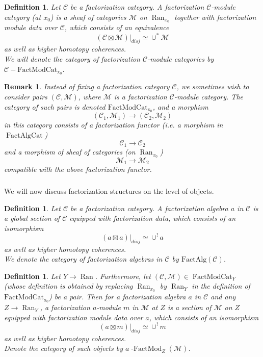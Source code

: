 \documentclass[10pt,a4paper]{amsart}
\newtheorem{defn}[subsubsection]{Definition}
\newtheorem{rem}[subsubsection]{Remark}
\newcommand{\on}[1]{\operatorname{#1}}
\newcommand{\Ran}{\on{Ran}}
\newcommand{\FactAlgCat}{\on{FactAlgCat}}
\newcommand{\FactModCat}{\on{FactModCat_{x_0}}}
\newcommand{\sssec}[1]{\subsubsection{}}
\begin{document}
\begin{defn}
    Let $\mathcal{C}$ be a factorization category. A factorization $\mathcal{C}$-module category (at $x_0$) is a sheaf of categories $\mathcal{M}$ on $\Ran_{x_0}$ together with factorization module data over $\mathcal{C}$, which consists of an equivalence 
    $$
        (\mathcal{C} \boxtimes \mathcal{M})|_{disj} \simeq \cup^* \mathcal{M}
    $$
    as well as higher homotopy coherences.
    \\
    We will denote the category of factorization $\mathcal{C}$-module categories by $\mathcal{C}-\FactModCat$.
\end{defn}

\begin{rem}
    Instead of fixing a factorization category $\mathcal{C}$, we sometimes wish to consider \emph{pairs} $(\mathcal{C}, \mathcal{M})$, where $\mathcal{M}$ is a factorization $\mathcal{C}$-module category. The category of such pairs is denoted $\FactModCat$, and a morphism
    $$
    (\mathcal{C}_1, \mathcal{M}_1) \to (\mathcal{C}_2, \mathcal{M}_2)
    $$
    in this category consists of a factorization functor (i.e. a morphism in $\FactAlgCat$)
    $$
    \mathcal{C}_1 \to \mathcal{C}_2
    $$
    and a morphism of sheaf of categories (on $\Ran_{x_0}$)
    $$
    \mathcal{M}_1 \to \mathcal{M}_2
    $$
    compatible with the above factorization functor.
\end{rem}

\sssec{}
We will now discuss factorization structures on the level of objects.

\begin{defn}
    Let $\mathcal{C}$ be a factorization category. A factorization algebra $a$ in $\mathcal{C}$ is a global section of $\mathcal{C}$ equipped with factorization data, which consists of an isomorphism
    $$
    (a \boxtimes a)|_{disj} \simeq \cup^!a
    $$
    as well as higher homotopy coherences.
    \\
    We denote the category of factorization algebras in $\mathcal{C}$ by $\on{FactAlg(\mathcal{C})}$.
\end{defn}

\begin{defn}
    Let $Y \to \Ran$. Furthermore, let $(\mathcal{C}, \mathcal{M}) \in \on{FactModCat}_{Y}$ (whose definition is obtained by replacing $\Ran_{x_0}$ by $\Ran_{Y}$ in the definition of $\FactModCat$) be a pair. Then for a factorization algebra $a$ in $\mathcal{C}$ and any $Z \to \Ran_Y$, a factorization $a$-module $m$ in $\mathcal{M}$ at $Z$ is a section of $\mathcal{M}$ on $Z$ equipped with factorization module data over $a$, which consists of an isomorphism
    $$
    (a \boxtimes m)|_{disj} \simeq \cup^!m
    $$
    as well as higher homotopy coherences.
    \\
    Denote the category of such objects by $a\on{-FactMod}_{Z}(\mathcal{M})$.
\end{defn}
\end{document}
